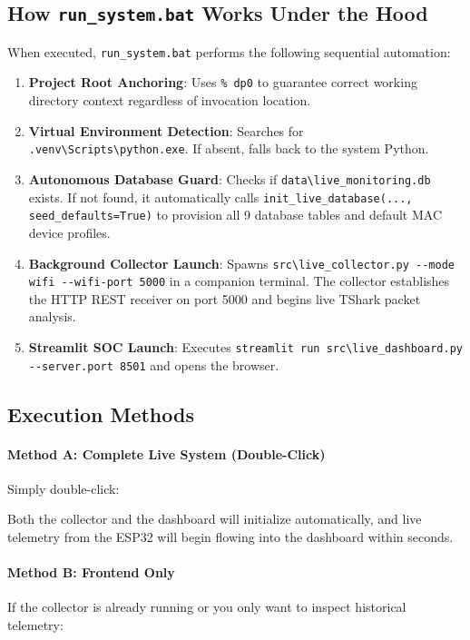 \documentclass[11pt,a4paper]{article}
\begin{document}
\subsection{How \texttt{run\_system.bat} Works Under the Hood}
When executed, \texttt{run\_system.bat} performs the following sequential automation:
\begin{enumerate}[noitemsep]
    \item \textbf{Project Root Anchoring}: Uses \texttt{\%~dp0} to guarantee correct working directory context regardless of invocation location.
    \item \textbf{Virtual Environment Detection}: Searches for \texttt{.venv\textbackslash Scripts\textbackslash python.exe}. If absent, falls back to the system Python.
    \item \textbf{Autonomous Database Guard}: Checks if \texttt{data\textbackslash live\_monitoring.db} exists. If not found, it automatically calls \texttt{init\_live\_database(..., seed\_defaults=True)} to provision all 9 database tables and default MAC device profiles.
    \item \textbf{Background Collector Launch}: Spawns \texttt{src\textbackslash live\_collector.py -{}-mode wifi -{}-wifi-port 5000} in a companion terminal. The collector establishes the HTTP REST receiver on port 5000 and begins live TShark packet analysis.
    \item \textbf{Streamlit SOC Launch}: Executes \texttt{streamlit run src\textbackslash live\_dashboard.py -{}-server.port 8501} and opens the browser.
\end{enumerate}

\subsection{Execution Methods}

\paragraph{Method A: Complete Live System (Double-Click)}
Simply double-click:
\begin{center}
\end{center}
Both the collector and the dashboard will initialize automatically, and live telemetry from the ESP32 will begin flowing into the dashboard within seconds.

\paragraph{Method B: Frontend Only}
If the collector is already running or you only want to inspect historical telemetry:
\begin{center}
\end{center}
\end{document}
